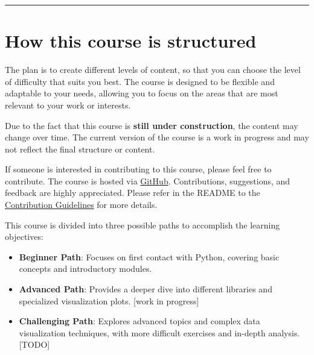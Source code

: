 \documentclass[
  letterpaper,
  DIV=11,
  numbers=noendperiod]{scrreprt}
\providecommand{\tightlist}{%
  \setlength{\itemsep}{0pt}\setlength{\parskip}{0pt}}\usepackage{longtable,booktabs,array}
\begin{document}
\begin{center}\rule{0.5\linewidth}{0.5pt}\end{center}

\section*{How this course is
structured}\label{how-this-course-is-structured}


The plan is to create different levels of content, so that you can
choose the level of difficulty that suits you best. The course is
designed to be flexible and adaptable to your needs, allowing you to
focus on the areas that are most relevant to your work or interests.

\begin{tcolorbox}[enhanced jigsaw, leftrule=.75mm, bottomrule=.15mm, colbacktitle=quarto-callout-important-color!10!white, title=\textcolor{quarto-callout-important-color}{\faExclamation}\hspace{0.5em}{Important}, breakable, arc=.35mm, toptitle=1mm, opacityback=0, titlerule=0mm, coltitle=black, colback=white, opacitybacktitle=0.6, colframe=quarto-callout-important-color-frame, left=2mm, rightrule=.15mm, toprule=.15mm, bottomtitle=1mm]

Due to the fact that this course is \textbf{still under construction},
the content may change over time. The current version of the course is a
work in progress and may not reflect the final structure or content.

If someone is interested in contributing to this course, please feel
free to contribute. The course is hosted via
\href{https://github.com/stkroe/pythonforchemists}{GitHub}.
Contributions, suggestions, and feedback are highly appreciated. Please
refer in the README to the
\href{https://github.com/stkroe/pythonforchemists/README}{Contribution
Guidelines} for more details.

\end{tcolorbox}

This course is divided into three possible paths to accomplish the
learning objectives:

\begin{itemize}
\tightlist
\item
  \textbf{Beginner Path}: Focuses on first contact with Python, covering
  basic concepts and introductory modules.
\item
  \textbf{Advanced Path}: Provides a deeper dive into different
  libraries and specialized visualization plots. {[}work in progress{]}
\item
  \textbf{Challenging Path}: Explores advanced topics and complex data
  visualization techniques, with more difficult exercises and in-depth
  analysis. {[}TODO{]}
\end{itemize}
\end{document}
